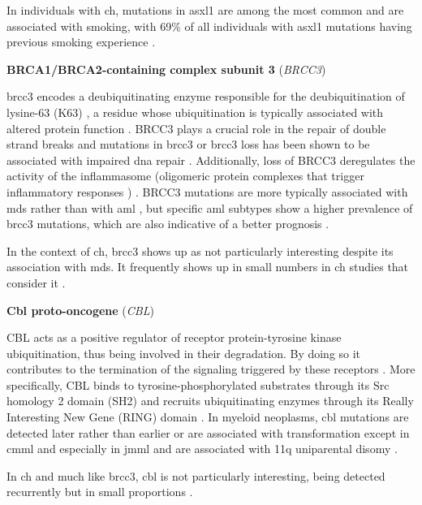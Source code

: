 In individuals with \ac{ch}, mutations in \ac{asxl1} are among the most common \cite{Jaiswal2014-rl,Genovese2014-eu} and are associated with smoking, with 69\% of all individuals with \ac{asxl1} mutations having previous smoking experience \cite{Dawoud2020-af}. 

\noindent \textbf{BRCA1/BRCA2-containing complex subunit 3} (\textit{BRCC3})

\ac{brcc3} encodes a deubiquitinating enzyme responsible for the deubiquitination of lysine-63 (K63) \cite{Dong2003-ei}, a residue whose ubiquitination is typically associated with altered protein function \cite{Meyer2020-yq}. BRCC3 plays a crucial role in the repair of double strand breaks and mutations in \ac{brcc3} or \ac{brcc3} loss has been shown to be associated with impaired \ac{dna} repair \cite{Chen2006-ub}. Additionally, loss of BRCC3 deregulates the activity of the inflammasome (oligomeric protein complexes that trigger inflammatory responses \cite{Broz2016-zn}) \cite{Py2013-wr}. BRCC3 mutations are more typically associated with \ac{mds} \cite{Huang2015-id} rather than with \ac{aml} \cite{noauthor_2013-ti}, but specific \ac{aml} subtypes show a higher prevalence of \ac{brcc3} mutations, which are also indicative of a better prognosis \cite{Jahn2017-dh,Meyer2020-yq}.

In the context of \ac{ch}, \ac{brcc3} shows up as not particularly interesting despite its association with \ac{mds}. It frequently shows up in small numbers in \ac{ch} studies that consider it \cite{Acuna-Hidalgo2017-ng,Steensma2018-ml,Fabre2020-as}. 

\noindent \textbf{Cbl proto-oncogene} (\textit{CBL})

CBL acts as a positive regulator of receptor protein-tyrosine kinase ubiquitination, thus being involved in their degradation. By doing so it contributes to the termination of the signaling triggered by these receptors \cite{Joazeiro1999-do}. More specifically, CBL binds to tyrosine-phosphorylated substrates through its Src homology 2 domain (SH2) and recruits ubiquitinating enzymes through its Really Interesting New Gene (RING) domain \cite{Thien2001-wm}. In myeloid neoplasms, \ac{cbl} mutations are detected later rather than earlier or are associated with transformation \cite{Valent2019-bx} except in \ac{cmml} \cite{Schnittger2009-kw} and especially in \ac{jmml} \cite{Loh2009-li,Muramatsu2010-ec} and are associated with 11q uniparental disomy \cite{Sanada2009-jh}.

In \ac{ch} and much like \ac{brcc3}, \ac{cbl} is not particularly interesting, being detected recurrently but in small proportions \cite{Gibson2018-yk}.


